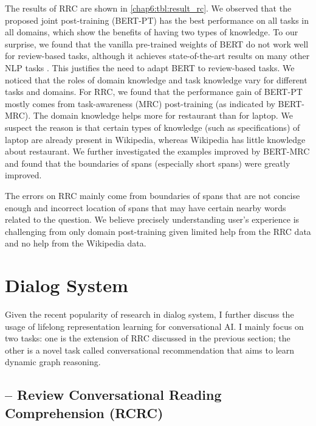 The results of RRC are shown in \ref{chap6:tbl:result_rc}. 
We observed that the proposed joint post-training (BERT-PT) has the best performance on all tasks in all domains, which show the benefits of having two types of knowledge.
To our surprise, we found that the vanilla pre-trained weights of BERT do not work well for review-based tasks, although it achieves state-of-the-art results on many other NLP tasks \cite{devlin2018bert}.
This justifies the need to adapt BERT to review-based tasks.
We noticed that the roles of domain knowledge and task knowledge vary for different tasks and domains.
For RRC, we found that the performance gain of BERT-PT mostly comes from task-awareness (MRC) post-training (as indicated by BERT-MRC).
The domain knowledge helps more for restaurant than for laptop.
We suspect the reason is that certain types of knowledge (such as specifications) of laptop are already present in Wikipedia, whereas Wikipedia has little knowledge about restaurant.
We further investigated the examples improved by BERT-MRC and found that the boundaries of spans (especially short spans) were greatly improved. 

The errors on RRC mainly come from boundaries of spans that are not concise enough and incorrect location of spans that may have certain nearby words related to the question. 
We believe precisely understanding user's experience is challenging from only domain post-training given limited help from the RRC data and no help from the Wikipedia data.

\section{Dialog System}
\label{chap6:sec:dialog}

Given the recent popularity of research in dialog system, I further discuss the usage of lifelong representation learning for conversational AI.
I mainly focus on two tasks: one is the extension of RRC discussed in the previous section; the other is a novel task called conversational recommendation that aims to learn dynamic graph reasoning.

\subsection{-- Review Conversational Reading Comprehension (RCRC)}
\label{chap6:sec:rcrc}


